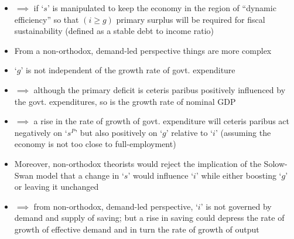 \documentclass[a4paper,twoside]{article}
\numberwithin{equation}{section}
\numberwithin{figure}{section}
\begin{document}
\begin{itemize}
	\item \( \implies \) if `\( s \)' is manipulated to keep the economy in the region of ``dynamic efficiency'' so that \( (i \geq g) \) primary surplus will be required for fiscal sustainability (defined as a stable debt to income ratio)
	\item From a non-orthodox, demand-led perspective things are more complex
	\item `\( g \)' is not independent of the growth rate of govt. expenditure
	\item \( \implies \) although the primary deficit is ceteris paribus positively influenced by the govt. expenditures, so is the growth rate of nominal GDP
	\item \( \implies \) a rise in the rate of growth of govt. expenditure will ceteris paribus act negatively on `\( s^P \)' but also positively on `\( g \)' relative to `\( i \)' (assuming the economy is not too close to full-employment)
	\item Moreover, non-orthodox theorists would reject the implication of the Solow-Swan model that a change in `\( s \)' would influence `\( i \)' while either boosting `\( g \)' or leaving it unchanged
	\item \( \implies \) from non-orthodox, demand-led perspective, `\( i \)' is not governed by demand and supply of saving; but a rise in saving could depress the rate of growth of effective demand and in turn the rate of growth of output
\end{itemize}
\end{document}

